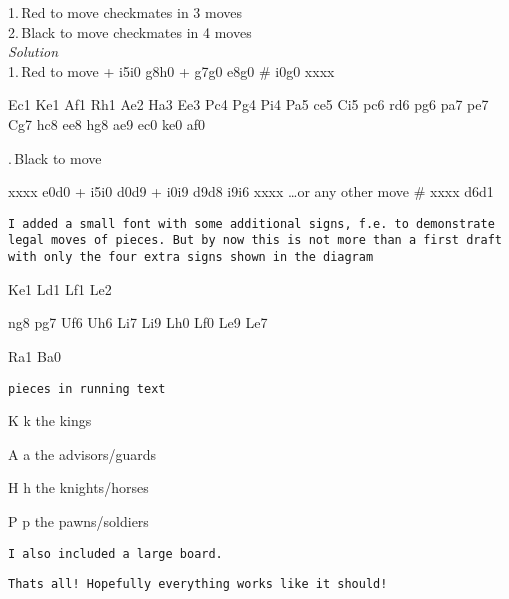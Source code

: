 \documentclass[twocolumn,11pt]{article}
\begin{document}
\showboard

1.\,Red to move checkmates in 3 moves\\
2.\,Black to move checkmates in 4 moves\\

\textit{Solution}\\

1.\,Red to move
\cr +
\move i5i0 g8h0
\cr +
\move g7g0 e8g0
\cr \#
\move i0g0 xxxx

\resetboard

\piece Ec1
\piece Ke1
\piece Af1
\piece Rh1
\piece Ae2
\piece Ha3
\piece Ee3
\piece Pc4
\piece Pg4
\piece Pi4
\piece Pa5
\piece ce5
\piece Ci5
\piece pc6
\piece rd6
\piece pg6
\piece pa7
\piece pe7
\piece Cg7
\piece hc8
\piece ee8
\piece hg8
\piece ae9
\piece ec0
\piece ke0
\piece af0

.\,Black to move

\move xxxx e0d0
\cr +
\move i5i0 d0d9
\cr +
\move i0i9 d9d8
\move i9i6 xxxx
\dots or any other move
\cb \#
\move xxxx d6d1 

\newpage

\texttt{I added a small font with some additional signs, f.e. to demonstrate legal moves of pieces. But by now this is not more than a first draft with only the four extra signs shown in the diagram} 

\resetboard

\piece Ke1
\addsign Ld1
\addsign Lf1
\addsign Le2

\piece ng8
\piece pg7
\addsign Uf6
\addsign Uh6
\addsign Li7
\addsign Li9
\addsign Lh0
\addsign Lf0
\addsign Le9
\addsign Le7

\addsign Ra1
\addsign Ba0

\showboard
\newpage

\texttt{pieces in running text}
\bigskip

\textpiece K \textpiece k 
the kings 

\vspace{2pt}

\textpiece A \textpiece a 
the advisors/guards

\makebox[21pt][c]{\vdots}

\vspace{4pt}
\westerntextpiece H \westerntextpiece h 
the knights/horses

\vspace{2pt}

\westerntextpiece P \westerntextpiece p 
the pawns/soldiers
\vspace{2pt}

\newpage
\onecolumn

\newgame
\texttt{I also included a large board.}
\showlargeboard 

\texttt{Thats all! Hopefully everything works like it should!}
\end{document}
